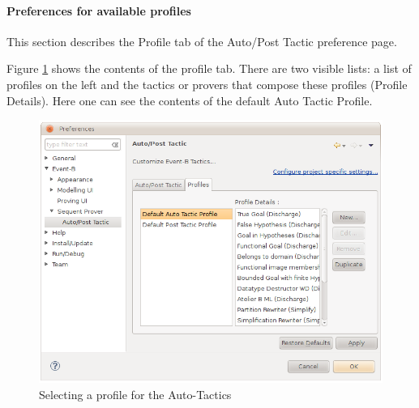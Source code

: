 

\paragraph{Preferences for available profiles}

This section describes the \textsf{Profile} tab of the \textsf{Auto/Post Tactic} preference page. 

Figure \ref{fig_ref_01_preferences9} shows the contents of the profile tab. There are two visible lists: a list of profiles on the left and the tactics or provers that compose these profiles (Profile Details). Here one can see the contents of the default Auto Tactic Profile.

\begin{figure}[!ht]
\begin{center}
	\includegraphics{img/reference/ref_01_preferences9.png}
	\caption{Selecting a profile for the Auto-Tactics}
	\label{fig_ref_01_preferences9}
\end{center}
\end{figure}

